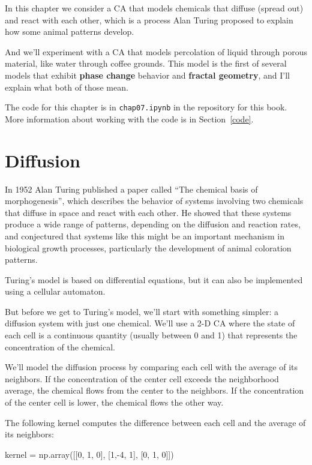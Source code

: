 \documentclass[12pt]{book}
\theoremstyle{exercise}
\begin{document}
In this chapter we consider a CA that models chemicals that diffuse (spread
out) and react with each other, which is a process Alan Turing proposed
to explain how some animal patterns develop.

And we'll experiment with a CA that models percolation of liquid
through porous material, like water through coffee grounds.  This
model is the first of several models that exhibit {\bf phase change}
behavior and {\bf fractal geometry}, and I'll explain what both of
those mean.

The code for this chapter is in {\tt chap07.ipynb} in the repository
for this book.  More information about working with the code is
in Section~\ref{code}.


\section{Diffusion}

In 1952 Alan Turing published a paper called ``The chemical basis
of morphogenesis'', which describes the behavior of systems involving
two chemicals that diffuse in space and react with each other.  He
showed that these systems produce a wide range of patterns, depending
on the diffusion and reaction rates, and conjectured that systems
like this might be an important mechanism in biological growth processes,
particularly the development of animal coloration patterns.

Turing's model is based on differential equations, but it can also
be implemented using a cellular automaton.

But before we get to Turing's model, we'll start with something simpler:
a diffusion system with just one chemical.  We'll use a 2-D CA where the
state of each cell is a continuous quantity (usually between 0 and 1)
that represents the concentration of the chemical.

We'll model the diffusion process by comparing each cell with the
average of its neighbors.  If the concentration of the center cell
exceeds the neighborhood average, the chemical flows from the center
to the neighbors.  If the concentration of the center cell is lower,
the chemical flows the other way.

The following kernel computes the difference between each cell
and the average of its neighbors:

\begin{code}
    kernel = np.array([[0, 1, 0],
                       [1,-4, 1],
                       [0, 1, 0]])
\end{code}
\end{document}
